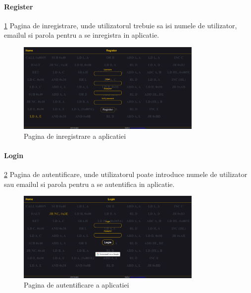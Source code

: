 \documentclass[titlepage,12pt]{article}
\begin{document}
\paragraph {Register} \cref {fig:registerpage} Pagina de inregistrare, unde utilizatorul trebuie sa isi numele de utilizator, emailul si parola pentru a se inregistra in aplicatie.
\begin{figure}[h!]
    \centering
    \includegraphics[width=0.8\textwidth]{images/registerpage.png}
    \caption{Pagina de inregistrare a aplicatiei}
    \label{fig:registerpage}
\end{figure}

\paragraph {Login} \cref {fig:loginpage} Pagina de autentificare, unde utilizatorul poate introduce numele de utilizator sau emailul si parola pentru a se autentifica in aplicatie.
\begin{figure}[h!]
    \centering
    \includegraphics[width=0.8\textwidth]{images/loginpage.png}
    \caption{Pagina de autentificare a aplicatiei}
    \label{fig:loginpage}
\end{figure}
\end{document}

